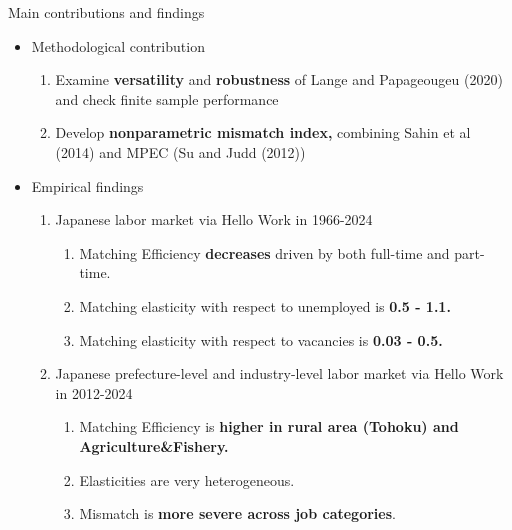 \documentclass[aspectratio=169]{beamer}
\begin{document}
\begin{frame}{Main contributions and findings}
\begin{itemize}
    \item Methodological contribution
    \begin{enumerate}
        \item Examine \textbf{versatility} and \textbf{robustness} of Lange and Papageougeu (2020) and check finite sample performance
        \item Develop \textbf{nonparametric mismatch index,} combining Sahin et al (2014) and MPEC (Su and Judd (2012))
    \end{enumerate}\pause
    \item Empirical findings
    \begin{enumerate}
        \item Japanese labor market via Hello Work in 1966-2024
        \begin{enumerate}
            \item Matching Efficiency \textbf{decreases} driven by both full-time and part-time.
            \item Matching elasticity with respect to unemployed is \textbf{0.5 - 1.1.}
            \item Matching elasticity with respect to vacancies is \textbf{0.03 - 0.5.}
        \end{enumerate}
        \item Japanese prefecture-level and industry-level labor market via Hello Work in 2012-2024
        \begin{enumerate}
            \item Matching Efficiency is\textbf{ higher in rural area (Tohoku) and Agriculture\&Fishery.} 
            \item Elasticities are very heterogeneous.
            \item Mismatch is \textbf{more severe across job categories}.
        \end{enumerate}
    \end{enumerate}
    
\end{itemize}
\end{frame}
\end{document}

